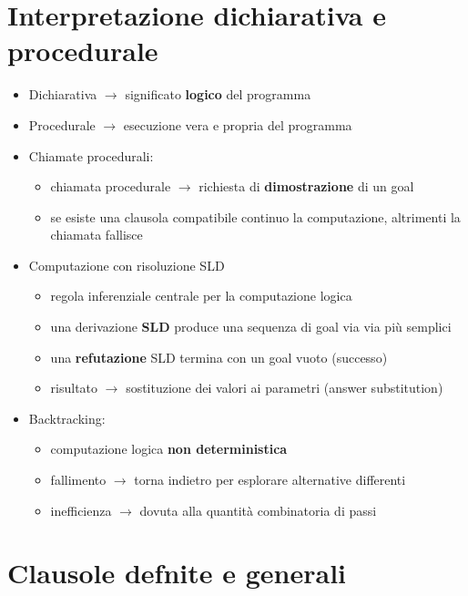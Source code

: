 \documentclass[12pt]{extarticle}
\begin{document}
\section*{Interpretazione dichiarativa e procedurale}
\begin{itemize}
  \item Dichiarativa $\rightarrow$ significato \textbf{logico} del programma
  \item Procedurale $\rightarrow$ esecuzione vera e propria del programma
  \item Chiamate procedurali:
  \begin{itemize}
    \item chiamata procedurale $\rightarrow$ richiesta di \textbf{dimostrazione} di un goal
    \item se esiste una clausola compatibile continuo la computazione, altrimenti la chiamata fallisce
  \end{itemize}
  \item Computazione con risoluzione SLD
  \begin{itemize}
    \item regola inferenziale centrale per la computazione logica
    \item una derivazione \textbf{SLD} produce una sequenza di goal via via più semplici
    \item una \textbf{refutazione} SLD termina con un goal vuoto (successo)
    \item risultato $\rightarrow$ sostituzione dei valori ai parametri (answer substitution)
  \end{itemize}
  \item Backtracking:
  \begin{itemize}
    \item computazione logica \textbf{non deterministica}
    \item fallimento $\rightarrow$ torna indietro per esplorare alternative differenti
    \item inefficienza $\rightarrow$ dovuta alla quantità combinatoria di passi
  \end{itemize}
\end{itemize}

\section*{Clausole defnite e generali}
\end{document}

